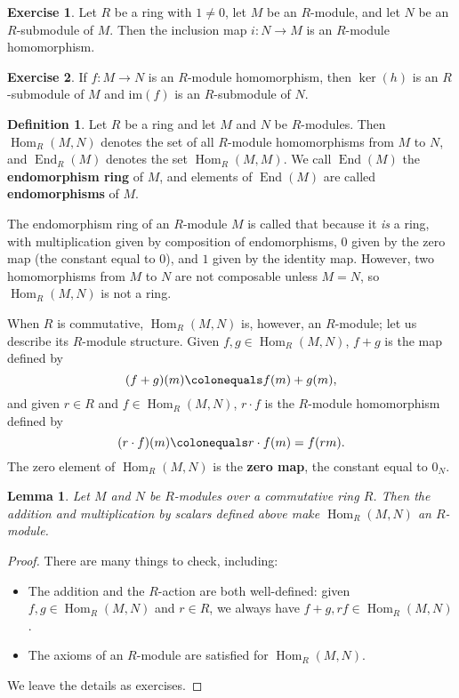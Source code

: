 \documentclass[12pt]{report}
\newtheorem{lemma}[theorem]{Lemma}
\numberwithin{equation}{section}
\numberwithin{theorem}{chapter}
\theoremstyle{definition}
\newtheorem{definition}[theorem]{Definition}
\newtheorem{exercise}{Exercise}
\newtheorem*{basic properties}{Basic Properties}
\newtheorem*{Important Remark}{Important Remark}
\newcommand{\df}[1]{{\bf #1}\index{#1}}
\renewcommand{\ker}{\operatorname{ker}}
\DeclareMathOperator{\End}{End}
\DeclareMathOperator{\Hom}{Hom}
\begin{document}
 
\begin{exercise}
Let $R$ be a ring with $1 \neq  0$, let $M$ be an $R$-module, and let $N$ be an $R$-submodule of $M$. Then the inclusion map $i\!: N \to M$ is an $R$-module homomorphism. 
\end{exercise}



\begin{exercise}
If $f\!: M \to N$ is an $R$-module homomorphism, then $\ker(h)$ is an $R$-submodule of $M$ and $\mathrm{im}(f)$ is an $R$-submodule of $N$.
\end{exercise}





\begin{definition}
Let $R$ be a ring and let $M$ and $N$ be $R$-modules. Then $\Hom_R(M,N)$ denotes the set of all $R$-module homomorphisms from $M$ to $N$, and $\End_R(M)$ denotes the set $\Hom_R(M,M)$. We call $\End(M)$ the \df{endomorphism ring} of $M$, and elements of $\End(M)$ are called \df{endomorphisms} of $M$.
\end{definition}

The endomorphism ring of an $R$-module $M$ is called that because it \emph{is} a ring, with multiplication given by composition of endomorphisms, $0$ given by the zero map (the constant equal to $0$), and $1$ given by the identity map. 
However, two homomorphisms from $M$ to $N$ are not composable unless $M = N$, so $\Hom_R(M,N)$ is not a ring. 

When $R$ is commutative, $\Hom_R(M,N)$ is, however, an $R$-module; let us describe its $R$-module structure.
	Given $f, g \in \Hom_R(M,N)$, $f+g$ is the map defined by
	$$(f+g)(m) \colonequals f(m) + g(m),$$ 
	and given $r \in R$ and $f \in \Hom_R(M,N)$, $r \cdot f$ is the $R$-module homomorphism defined by
	$$(r \cdot f) (m) \colonequals r \cdot f(m) = f(rm).$$
	The zero element of $\Hom_R(M,N)$ is the {\bf zero map}, the constant equal to $0_N$.

\begin{lemma}\label{Hom is an Rmod}
	Let $M$ and $N$ be $R$-modules over a commutative ring $R$. Then the addition and multiplication by scalars defined above make $\Hom_R(M,N)$ an $R$-module.
\end{lemma}

\begin{proof}
There are many things to check, including:
\begin{itemize}
\item The addition and the $R$-action are both well-defined: given $f,g\in \Hom_R(M,N)$ and $r\in R$, we always have $f+g, rf\in \Hom_R(M,N)$.
\item The axioms of an $R$-module are satisfied for $\Hom_R(M,N)$.
\end{itemize}
 We leave the details as exercises.
\end{proof}
\end{document}
